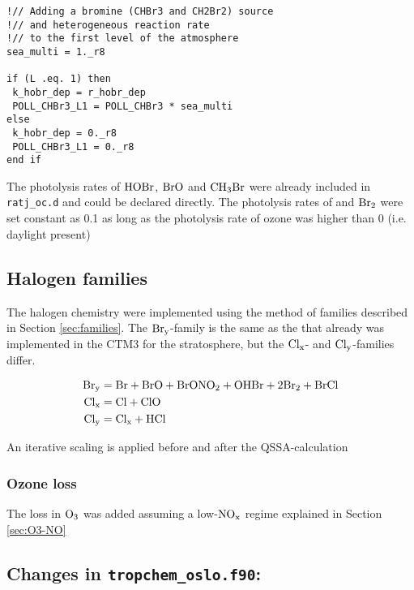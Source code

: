 \begin{lstlisting}
!// Adding a bromine (CHBr3 and CH2Br2) source 
!// and heterogeneous reaction rate 
!// to the first level of the atmosphere
sea_multi = 1._r8

if (L .eq. 1) then
 k_hobr_dep = r_hobr_dep
 POLL_CHBr3_L1 = POLL_CHBr3 * sea_multi
else
 k_hobr_dep = 0._r8
 POLL_CHBr3_L1 = 0._r8
end if
\end{lstlisting}


The photolysis rates of $\mathrm{HOBr}$, $\mathrm{BrO}$ and $\mathrm{CH_3Br}$ were already included in \texttt{ratj\_oc.d} and could be declared directly. The photolysis rates of  and $\mathrm{Br_2}$ were set constant as 0.1 as long as the photolysis rate of ozone was higher than 0 (i.e. daylight present)


\subsection{Halogen families}

The halogen chemistry were implemented using the method of families described in Section \ref{sec:families}. The $\mathrm{Br_y}$-family is the same as the that already was implemented in the CTM3 for the stratosphere, but the $\mathrm{Cl_x}$- and $\mathrm{Cl_y}$-families differ. 
 
\begin{align*}
    \mathrm{Br_y} &= \mathrm{Br} + \mathrm{BrO} + \mathrm{BrONO_2} + \mathrm{OHBr} + 2\mathrm{Br_2} + \mathrm{BrCl} \\
    \mathrm{Cl_x} &= \mathrm{Cl} + \mathrm{ClO} \\
    \mathrm{Cl_y} &= \mathrm{Cl_x} + \mathrm{HCl}
\end{align*}

An iterative scaling is applied before and after the QSSA-calculation



\subsubsection{Ozone loss}


The loss in $\mathrm{O_3}$ was added assuming a low-$\mathrm{NO_x}$ regime explained in Section \ref{sec:O3-NO}

\subsection{Changes in \texttt{tropchem\_oslo.f90}:}\label{sec:tropchem_oslo}

